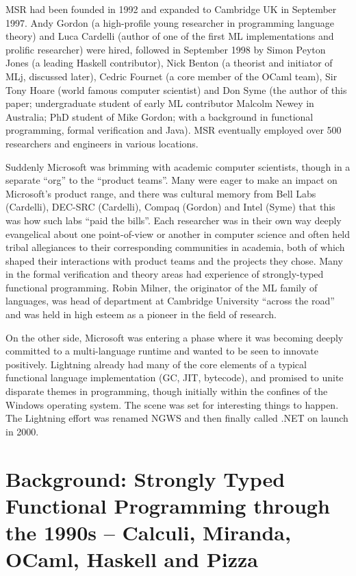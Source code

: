 \documentclass[acmsmall]{acmart}\settopmatter{}
\begin{document}
MSR had been founded in 1992 and expanded to Cambridge UK in September 1997. Andy Gordon (a high-profile young researcher in
programming language theory) and Luca Cardelli (author of one of the first ML implementations and prolific researcher) were hired, followed
in September 1998 by Simon Peyton Jones (a leading Haskell contributor), Nick Benton (a theorist and initiator of MLj, discussed later), Cedric
Fournet (a core member of the OCaml team), Sir Tony Hoare (world famous computer scientist) and Don Syme (the author of this paper; undergraduate
student of early ML contributor Malcolm Newey in Australia; PhD student of Mike Gordon; with a background in functional programming, formal
verification and Java). MSR eventually employed over 500 researchers and engineers in various locations.  

Suddenly Microsoft was brimming with academic computer scientists, though in a separate “org” to the “product teams”.  Many were eager
to make an impact on Microsoft’s product range, and there was cultural memory from Bell Labs (Cardelli), DEC-SRC (Cardelli), Compaq (Gordon) and
Intel (Syme) that this was how such labs “paid the bills”.  Each researcher was in their own way deeply evangelical about one point-of-view or
another in computer science and often held tribal allegiances to their corresponding communities in academia, both of which shaped their
interactions with product teams and the projects they chose. Many in the formal verification and theory areas had experience of strongly-typed
functional programming. Robin Milner, the originator of the ML family of languages, was head of department at Cambridge University “across the road” and
was held in high esteem as a pioneer in the field of research. 

On the other side, Microsoft was entering a phase where it was becoming deeply committed to a multi-language runtime and wanted to be
seen to innovate positively.  Lightning already had many of the core elements of a typical functional language implementation (GC, JIT, bytecode), and
promised to unite disparate themes in programming, though initially within the confines of the Windows operating system. The scene was set
for interesting things to happen. The Lightning effort was renamed NGWS and then finally called .NET on launch in 2000.  

\section*{Background: Strongly Typed Functional Programming through the 1990s – Calculi, Miranda, OCaml, Haskell and Pizza}
\end{document}
